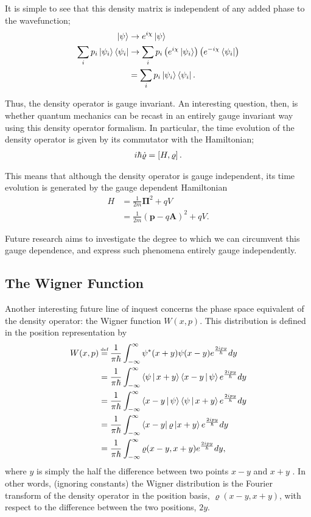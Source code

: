 It is simple to see that this density matrix is independent of any added phase
to the wavefunction;
\begin{align}
    \Ket{\psi} &\rightarrow e^{i \chi} \Ket{\psi} \\
    \sum_i p_i \Ket{\psi_i}\bra{\psi_i} &\rightarrow \sum_i p_i \left( e^{i
    \chi} \Ket{\psi_i} \right) \left( e^{-i \chi} \bra{\psi_i} \right) \notag \\
    &= \sum_i p_i \Ket{\psi_i} \bra{\psi_i}. \notag
\end{align}

Thus, the density operator is gauge invariant. An interesting question, then, is
whether quantum mechanics can be recast in an entirely gauge invariant way using
this density operator formalism. In particular, the time evolution of the
density operator is given by its commutator with the Hamiltonian;
\begin{align}
    i \hbar \dot{\varrho} = \left[ H , \varrho \right].
\end{align}

This means that although the density operator is gauge independent, its time
evolution is generated by the gauge dependent Hamiltonian
\begin{align}
    H &= \frac{1}{2m} \mathbf{\Pi}^2 + qV \\
      &= \frac{1}{2m} \left( \mathbf{p} - q \mathbf{A} \right)^2 + qV.
\end{align}

Future research aims to investigate the degree to which we can circumvent this
gauge dependence, and express such phenomena entirely gauge independently.

\subsection{The Wigner Function}

Another interesting future line of inquest concerns the phase space equivalent
of the density operator: the Wigner function $W(x,p)$. This distribution is
defined in the position representation by
\begin{align}
    W(x,p) &\defeq \frac{1}{\pi \hbar} \int_{-\infty}^{\infty} \psi^*(x+y)
    \psi(x-y) e^{\frac{2ipy}{\hbar}} dy \\
    &= \frac{1}{\pi \hbar} \int_{-\infty}^{\infty} \Braket{\psi|x+y}
    \Braket{x-y|\psi} e^{\frac{2ipy}{\hbar}} dy \\
    &= \frac{1}{\pi \hbar} \int_{-\infty}^{\infty}\Braket{x-y|\psi}
    \Braket{\psi|x+y} e^{\frac{2ipy}{\hbar}} dy \\
    &= \frac{1}{\pi \hbar} \int_{-\infty}^{\infty} \Bra{x-y} \varrho \Ket{x+y}
    e^{\frac{2ipy}{\hbar}} dy \\
    &= \frac{1}{\pi \hbar} \int_{-\infty}^{\infty} \varrho(x-y,x+y)
    e^{\frac{2ipy}{\hbar}} dy,
\end{align}
where $y$ is simply the half the difference between two points $x - y$ and $x +
y$ \cite{wigner}. In other words, (ignoring constants) the Wigner distribution is the Fourier
transform of the density operator in the position basis, $\varrho(x-y,x+y)$,
with respect to the difference between the two positions, $2y$.

